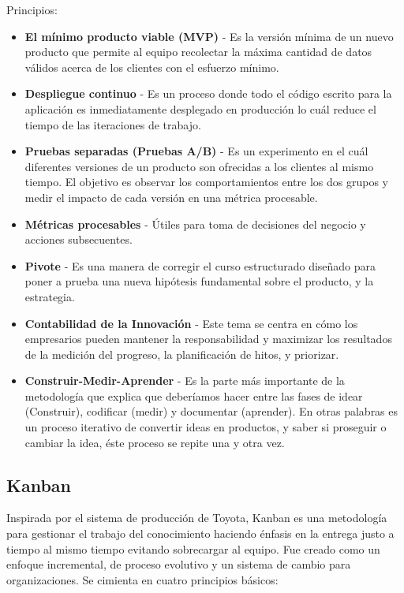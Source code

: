 \documentclass[conference]{IEEEtran}
\begin{document}
Principios:

\begin{itemize}
 \item {\bf El mínimo producto viable (MVP)} - Es la versión mínima de un nuevo producto que permite al equipo recolectar la máxima cantidad de datos válidos acerca de los clientes con el esfuerzo mínimo. 
 \item {\bf Despliegue continuo} - Es un proceso donde todo el código escrito para la aplicación es inmediatamente desplegado en producción lo cuál reduce el tiempo de las iteraciones de trabajo.
 \item {\bf Pruebas separadas (Pruebas A/B)} -  Es un experimento en el cuál diferentes versiones de un producto son ofrecidas a los clientes al mismo tiempo. El objetivo es observar los comportamientos entre los dos grupos y medir el impacto de cada versión en una métrica procesable.
 \item {\bf Métricas procesables} - Útiles para toma de decisiones del negocio y acciones subsecuentes.
 \item {\bf Pivote} - Es una manera de corregir el curso estructurado diseñado para poner a prueba una nueva hipótesis fundamental sobre el producto, y la estrategia.
 \item {\bf Contabilidad de la Innovación} - Este tema se centra en cómo los empresarios pueden mantener la responsabilidad y maximizar los resultados de la medición del progreso, la planificación de hitos, y priorizar.
 \item {\bf Construir-Medir-Aprender} - Es la parte más importante de la metodología que explica que deberíamos hacer entre las fases de idear (Construir), codificar (medir) y documentar (aprender). En otras palabras es un proceso iterativo de convertir ideas en productos, y saber si proseguir o cambiar la idea, éste proceso se repite una y otra vez.
\end{itemize}

\subsection{Kanban}

Inspirada por el sistema de producción de Toyota, Kanban es una metodología para gestionar el trabajo del conocimiento haciendo énfasis en la entrega justo a tiempo al mismo tiempo evitando sobrecargar al equipo. Fue creado como un enfoque incremental, de proceso evolutivo y un sistema de cambio para organizaciones.  Se cimienta en cuatro principios básicos:
\end{document}
